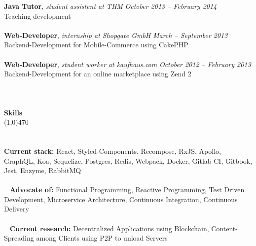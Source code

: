 \documentclass[10pt]{article} %
\begin{document}
\noindent
{\bf Java Tutor}, \textit{student assistent at THM}  \hfill \textit{ October 2013 -- February 2014 } \\ 
Teaching development\\\\
\noindent
{\bf Web-Developer}, \textit{internship at Shopgate GmbH}  \hfill \textit{ March -- September 2013 } \\ 
Backend-Development for Mobile-Commerce using CakePHP\\\\
\noindent
{\bf Web-Developer}, \textit{student worker at kaufhaus.com}  \hfill \textit{ October 2012 -- February 2013 } \\ 
Backend-Development for an online marketplace using Zend 2\\\\
\noindent
\\\\
{\Large \bf Skills}\\
\line(1,0){470}\\
\\\\
\noindent
{\bf Current stack:} React, Styled-Components, Recompose, RxJS, Apollo, GraphQL, Koa, Sequelize, Postgres, Redis, Webpack, Docker, Gitlab CI, Gitbook, Jest, Enzyme, RabbitMQ \\\\\
\noindent
{\bf Advocate of:} Functional Programming, Reactive Programming, Test Driven Development, Microservice Architecture, Continuous Integration, Continuous Delivery \\\\\
\noindent
{\bf Current research:} Decentralized Applications using Blockchain, Content-Spreading among Clients using P2P to unload Servers \\\\\
\end{document}
